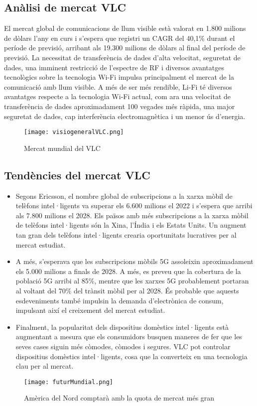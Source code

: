 
\subsection*{Anàlisi de mercat VLC}

El mercat global de comunicacions de llum visible està valorat en 1.800 milions de dòlars l'any en curs i s'espera que registri un CAGR del 40,1\% durant el període de previsió, arribant als 19.300 milions de dòlars al final del període de previsió. La necessitat de transferència de dades d'alta velocitat, seguretat de dades, una imminent restricció de l'espectre de RF i diversos avantatges tecnològics sobre la tecnologia Wi-Fi impulsa principalment el mercat de la comunicació amb llum visible. A més de ser més rendible, Li-Fi té diversos avantatges respecte a la tecnologia Wi-Fi actual, com ara una velocitat de transferència de dades aproximadament 100 vegades més ràpida, una major seguretat de dades, cap interferència electromagnètica i un menor ús d'energia.


\begin{figure}[h!]
    \centering
    \texttt{[image: visiogeneralVLC.png]}
    \caption{Mercat mundial del VLC }
\end{figure}



\subsection*{Tendències del mercat VLC}

\begin{itemize}
    \item Segons Ericsson, el nombre global de subscripcions a la xarxa mòbil de telèfons intel·ligents va superar els 6.600 milions el 2022 i s'espera que arribi als 7.800 milions el 2028. Els països amb més subscripcions a la xarxa mòbil de telèfons intel·ligents són la Xina, l'Índia i els Estats Units. Un augment tan gran dels telèfons intel·ligents crearia oportunitats lucratives per al mercat estudiat. 
    \item A més, s'esperava que les subscripcions mòbils 5G assoleixin aproximadament els 5.000 milions a finals de 2028. A més, es preveu que la cobertura de la població 5G arribi al 85\%, mentre que les xarxes 5G probablement portaran al voltant del 70\% del trànsit mòbil per al 2028. És probable que aquests esdeveniments també impulsin la demanda d'electrònica de consum, impulsant així el creixement del mercat estudiat. 
    \item Finalment, la popularitat dels dispositius domèstics intel·ligents està augmentant a mesura que els consumidors busquen maneres de fer que les seves cases siguin més còmodes, còmodes i segures. VLC pot controlar dispositius domèstics intel·ligents, cosa que la converteix en una tecnologia clau per al mercat.
\end{itemize}


\begin{figure}[h!]
    \centering
    \texttt{[image: futurMundial.png]}
    \caption{Amèrica del Nord comptarà amb la quota de mercat més gran}
\end{figure}








